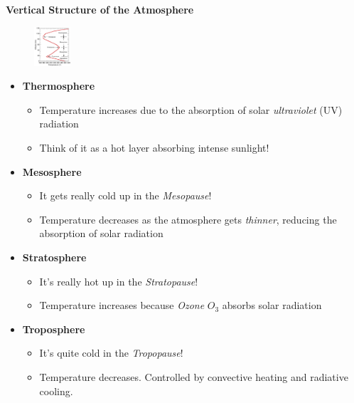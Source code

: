 \documentclass[fontsize=8pt, a4paper, landscape, fleqn]{scrartcl}
\renewcommand{\subsection}[1]{%
    \noindent\colorbox{subsectioncolor}{%
        \parbox{\dimexpr\columnwidth-2\fboxsep}{\color{white}\textbf{#1}}}%
    \vspace{0.5mm}%
}
\begin{document}
\begin{multicols*}{3}[\raggedcolumns]
\subsection{Vertical Structure of the Atmosphere}
\begin{figure}
    \centering
    \includegraphics[width=0.12\textwidth]{Secondary/img/Pasted image 20250407145244.png}
\end{figure}
\begin{itemize}
    \item \textbf{Thermosphere} 
        \begin{itemize}
            \item Temperature increases due to the absorption of solar \textit{ultraviolet} (UV) radiation
            \item Think of it as a hot layer absorbing intense sunlight! 
        \end{itemize}
    \item \textbf{Mesosphere} 
        \begin{itemize}
            \item It gets really cold up in the \textit{Mesopause}! 
            \item Temperature decreases as the atmosphere gets \textit{thinner}, reducing the absorption of solar radiation
        \end{itemize}
    \item \textbf{Stratosphere} 
        \begin{itemize}
            \item It's really hot up in the \textit{Stratopause}! 
            \item Temperature increases because \textit{Ozone} $O_3$ absorbs solar radiation 
        \end{itemize}
    \item \textbf{Troposphere} 
        \begin{itemize}
            \item It's quite cold in the \textit{Tropopause}! 
            \item Temperature decreases. Controlled by convective heating and radiative cooling.

\end{itemize}
\end{itemize}
\end{multicols*}
\end{document}
